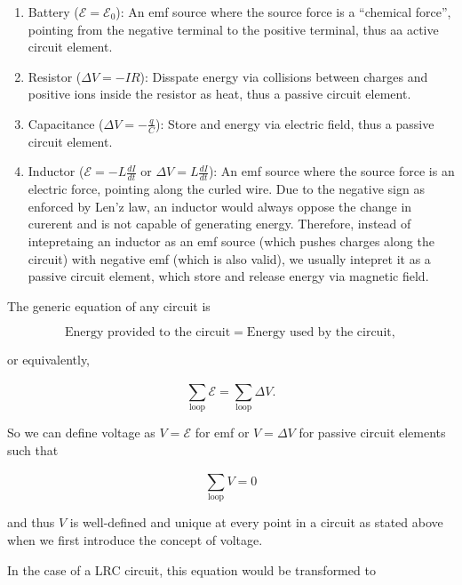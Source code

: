 \documentclass[english,a4paper,12pt]{report}
\begin{document}
\begin{enumerate}
    \item Battery (\(\mathcal{E} = \mathcal{E}_{0} \)): An emf source where the source force is a ``chemical force'', pointing from the negative terminal to the positive terminal, thus aa active circuit element.
    \item Resistor (\(\Delta V = -IR\)): Disspate energy via collisions between charges and positive ions inside the resistor as heat, thus a passive circuit element.
    \item Capacitance (\(\Delta V = -\frac{q}{C} \)): Store and energy via electric field, thus a passive circuit element.
    \item Inductor (\(\mathcal{E} = -L\frac{dI}{dt} \text { or } \Delta V = L\frac{dI}{dt} \)): An emf source where the source force is an electric force, pointing along the curled wire. Due to the negative sign as enforced by Len'z law, an inductor would always oppose the change in curerent and is not capable of generating energy. Therefore, instead of intepretaing an inductor as an emf source (which pushes charges along the circuit) with negative emf (which is also valid), we usually intepret it as a passive circuit element, which store and release energy via magnetic field.   
\end{enumerate}

The generic equation of any circuit is 

\begin{equation}
    \text{Energy provided to the circuit} = \text{Energy used by the circuit},
\end{equation}

or equivalently, 

\begin{equation} \label{energycircuit} 
    \sum_{\text{loop} }^{} \mathcal{E} = \sum_{\text{loop} }^{} \Delta V. 
\end{equation}

So we can define voltage as \(V = \mathcal{E}\) for emf or \(V = \Delta V\) for passive circuit elements such that 

\begin{equation}
    \sum_{\text{loop} }^{} V = 0 
\end{equation}

and thus \(V\) is well-defined and unique at every point in a circuit as stated above when we first introduce the concept of voltage.



In the case of a LRC circuit, this equation would be transformed to 
\end{document}
